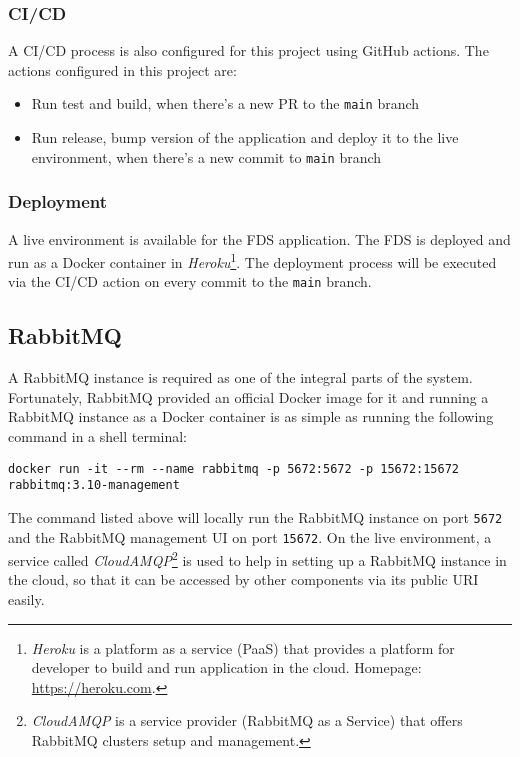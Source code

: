   \subsubsection{CI/CD}
  A CI/CD process is also configured for this project using GitHub actions. The actions configured in this project are:

   \begin{itemize}
    \item Run test and build, when there's a new PR to the \verb;main; branch
    \item Run release, bump version of the application and deploy it to the live environment, when there's a new commit to \verb;main; branch
   \end{itemize}
   
  \subsubsection{Deployment}
  A live environment is available for the FDS application. The FDS is deployed and run as a Docker container in \emph{Heroku}\footnote{\emph{Heroku} is a platform as a service (PaaS) that provides a platform for developer to build and run application in the cloud. Homepage: \url{https://heroku.com}.}. The deployment process will be executed via the CI/CD action on every commit to the \verb;main; branch. 

 \subsection{RabbitMQ}
 A RabbitMQ instance is required as one of the integral parts of the system. Fortunately, RabbitMQ provided an official Docker image for it and running a RabbitMQ instance as a Docker container is as simple as running the following command in a shell terminal:

 \begin{lstlisting}[caption={Running a RabbitMQ instance with Docker (Shell)}]
 docker run -it --rm --name rabbitmq -p 5672:5672 -p 15672:15672 rabbitmq:3.10-management 
 \end{lstlisting}

 The command listed above will locally run the RabbitMQ instance on port \verb;5672; and the RabbitMQ management UI on port \verb;15672;. On the live environment, a service called \emph{CloudAMQP}\footnote{\emph{CloudAMQP} is a service provider (RabbitMQ as a Service) that offers RabbitMQ clusters setup and management.} is used to help in setting up a RabbitMQ instance in the cloud, so that it can be accessed by other components via its public URI easily.

